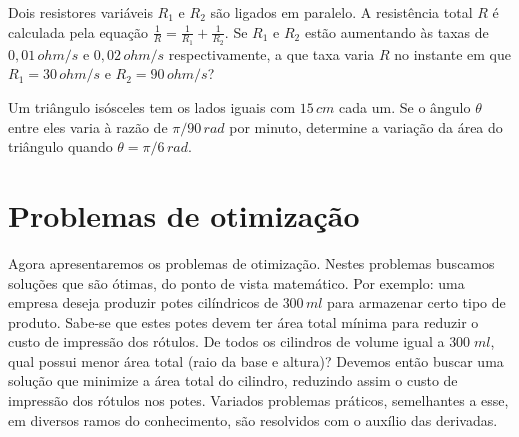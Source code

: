 \cleardoublepage\documentclass[../main.tex]{subfiles}
\begin{document}
\begin{exer}
Dois resistores variáveis $R_1 $ e $R_2$  são ligados em paralelo. A resistência total $R$ é calculada 
pela equação $\frac{1}{R}=\frac{1}{R_1}+\frac{1}{R_2}$. Se $R_1$ e $ R_2$  estão aumentando às taxas de 
$0,01\, ohm/s$ e $0,02\, ohm/s$ respectivamente, a que taxa varia $R$ no instante em que $R_1= 30\, ohm/s$ e $R_2= 90\, ohm/s$?
\end{exer}
\begin{exer}
Um triângulo isósceles tem os lados iguais com $15   \, cm$ cada um. Se o ângulo $\theta $ entre eles varia à 
razão de $\pi /90\, rad$ por minuto, determine a variação da área do triângulo quando $\theta  = \pi/6 \, rad$. 
\end{exer}
\section{Problemas de otimização}\hypertarget{Otimiza}{}\label{sec:Otmiz}
 Agora apresentaremos os problemas de otimização. Nestes problemas buscamos soluções que são ótimas, do ponto de vista matemático. Por exemplo: uma empresa deseja produzir potes cilíndricos de $300\, ml$ para armazenar certo tipo de produto. Sabe-se que estes potes devem ter  área total mínima para reduzir o custo de impressão dos rótulos. De todos os cilindros de volume igual a $300\; ml$, qual possui menor área total (raio da base e altura)? Devemos então buscar uma solução que minimize a área total do cilindro, reduzindo assim o custo de impressão dos rótulos nos potes. Variados problemas práticos, semelhantes a esse, em diversos ramos do conhecimento, são resolvidos com o auxílio das derivadas. 
\end{document}

